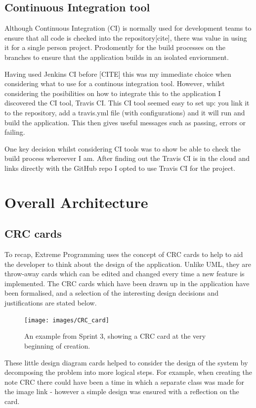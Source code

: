 \subsection{Continuous Integration tool}
Although Continuous Integration (CI) is normally used for development teams to ensure that all code is checked into the repository[cite], there was value in using it for a single person project. Prodomently for the build processes on the branches to ensure that the application builds in an isolated enviornment.

Having used Jenkins CI before [CITE] this was my immediate choice when considering what to use for a continous integration tool. However, whilst considering the posibilities on how to integrate this to the application I discovered the CI tool, Travis CI. This CI tool seemed easy to set up: you link it to the repository, add a travis.yml file (with configurations) and it will run and build the application. This then gives useful messages such as passing, errors or failing.

One key decision whilst considering CI tools was to show be able to check the build process whereever I am. After finding out the Travis CI is in the cloud and links directly with the GitHub repo I opted to use Travis CI for the project.


\section{Overall Architecture}

\subsection{CRC cards}
To recap, Extreme Programming uses the concept of CRC cards to help to aid the developer to think about the design of the application. Unlike UML, they are throw-away cards which can be edited and changed every time a new feature is implemented. The CRC cards which have been drawn up in the application have been formalised, and a selection of the interesting design decisions and justifications are stated below.

\begin{figure}[h]
  \centering
  \texttt{[image: images/CRC\_card]}
  \caption{An example from Sprint 3, showing a CRC card at the very beginning of creation.}
  \label{fig:crc1}
\end{figure}

These little design diagram cards helped to consider the design of the system by decomposing the problem into more logical steps. For example, when creating the note CRC there could have been a time in which a separate class was made for the image link - however a simple design was ensured with a reflection on the card.

